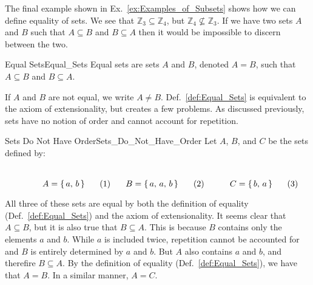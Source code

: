        The final example shown in Ex.~\ref{ex:Examples_of_Subsets}
        shows how we can define equality of sets. We see that
        $\mathbb{Z}_{3}\subseteq\mathbb{Z}_{4}$, but
        $\mathbb{Z}_{4}\nsubseteq\mathbb{Z}_{3}$. If we have two sets
        $A$ and $B$ such that $A\subseteq{B}$ and $B\subseteq{A}$ then
        it would be impossible to discern between the two.
        \begin{fdefinition}{Equal Sets}{Equal_Sets}
            Equal sets are sets $A$ and $B$, denoted $A=B$, such that
            $A\subseteq{B}$ and $B\subseteq{A}$.
        \end{fdefinition}
        If $A$ and $B$ are not equal, we write $A\ne{B}$.
        Def.~\ref{def:Equal_Sets} is equivalent to the axiom of
        extensionality, but creates a few problems. As discussed
        previously, sets have no notion of order and cannot account
        for repetition.
        \begin{lexample}{Sets Do Not Have Order}{Sets_Do_Not_Have_Order}
            Let $A$, $B$, and $C$ be the sets defined by:
            \par
            \begin{subequations}
                \begin{minipage}[b]{0.32\textwidth}
                    \begin{equation}
                        A=\{\,a,\,b\,\}
                    \end{equation}
                \end{minipage}
                \hfill
                \begin{minipage}[b]{0.32\textwidth}
                    \begin{equation}
                        B=\{\,a,\,a,\,b\,\}
                    \end{equation}
                \end{minipage}
                \hfill
                \begin{minipage}[b]{0.32\textwidth}
                    \begin{equation}
                        C=\{\,b,\,a\,\}
                    \end{equation}
                \end{minipage}
            \end{subequations}
            \par\vspace{2.5ex}
            All three of these sets are equal by both the definition of
            equality (Def.~\ref{def:Equal_Sets}) and the axiom of
            extensionality. It seems clear that $A\subseteq{B}$, but it is
            also true that $B\subseteq{A}$. This is because $B$ contains only
            the elements $a$ and $b$. While $a$ is included twice,
            repetition cannot be accounted for and $B$ is entirely
            determined by $a$ and $b$. But $A$ also contains $a$ and $b$, and
            therefire $B\subseteq{A}$. By the definition of equality
            (Def.~\ref{def:Equal_Sets}), we have that $A=B$. In a similar
            manner, $A=C$.
        \end{lexample}
